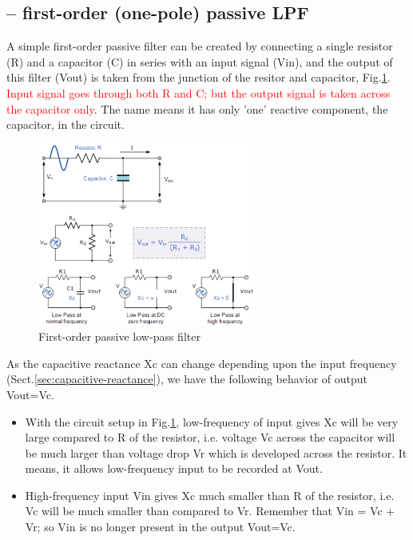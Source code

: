 \subsection{-- first-order (one-pole) passive LPF}
\label{sec:low-pass-filter-first-order}
\label{sec:low-pass-filter-one-pole}


A simple first-order passive filter can be created by connecting a single
resistor (R) and a capacitor (C) in series with an input signal (Vin), and the
output of this filter (Vout) is taken from the junction of the resitor and
capacitor, Fig.\ref{fig:filter-first-order-passive}.
\textcolor{red}{Input signal goes through both R and C; but the output signal
is taken across the capacitor only}. The name means it has only 'one' reactive
component, the capacitor, in the circuit.

\begin{figure}[hbt]
  \centerline{\includegraphics[height=6cm,
    angle=0]{./images/filter-first-order-passive.eps}}
  \caption{First-order passive low-pass filter}
  \label{fig:filter-first-order-passive}
\end{figure}


As the capacitive reactance Xc can change depending upon the input frequency
(Sect.\ref{sec:capacitive-reactance}), we have the following behavior of output
Vout=Vc.
\begin{itemize}

  \item  With the circuit setup in Fig.\ref{fig:filter-first-order-passive},
  low-frequency of input gives Xc will be very large compared to R of the
  resistor, i.e. voltage Vc across the capacitor will be much larger than
  voltage drop Vr which is developed across the resistor. It means, it allows
  low-frequency input to be recorded at Vout.

  \item High-frequency input Vin gives Xc much smaller than R of the resistor,
  i.e. Vc will be much smaller than compared to Vr. Remember that Vin = Vc +
  Vr; so Vin is no longer present in the output Vout=Vc.
\end{itemize}


